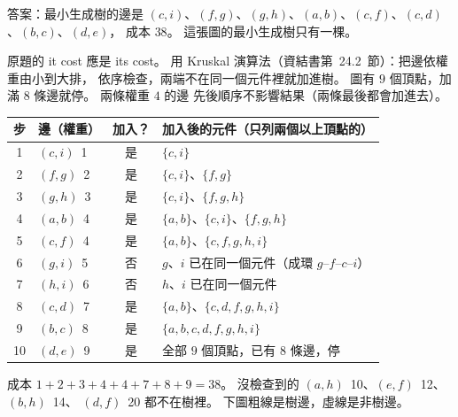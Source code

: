 \begin{pastsoln}
答案：最小生成樹的邊是 $(c,i)$、$(f,g)$、$(g,h)$、$(a,b)$、$(c,f)$、$(c,d)$、$(b,c)$、$(d,e)$，
成本 $38$。 這張圖的最小生成樹只有一棵。

原題的 it cost 應是 its cost。 用 Kruskal 演算法（資結書第~24.2~節）：把邊依權重由小到大排，
依序檢查，兩端不在同一個元件裡就加進樹。 圖有 $9$ 個頂點，加滿 $8$ 條邊就停。 兩條權重 $4$ 的邊
先後順序不影響結果（兩條最後都會加進去）。

\begin{center}
\small
\begin{tabular}{clcl}
\toprule
步 & 邊（權重） & 加入？ & 加入後的元件（只列兩個以上頂點的） \\
\midrule
1 & $(c,i)$~1 & 是 & $\{c,i\}$ \\
2 & $(f,g)$~2 & 是 & $\{c,i\}$、$\{f,g\}$ \\
3 & $(g,h)$~3 & 是 & $\{c,i\}$、$\{f,g,h\}$ \\
4 & $(a,b)$~4 & 是 & $\{a,b\}$、$\{c,i\}$、$\{f,g,h\}$ \\
5 & $(c,f)$~4 & 是 & $\{a,b\}$、$\{c,f,g,h,i\}$ \\
6 & $(g,i)$~5 & 否 & $g$、$i$ 已在同一個元件（成環 $g$--$f$--$c$--$i$） \\
7 & $(h,i)$~6 & 否 & $h$、$i$ 已在同一個元件 \\
8 & $(c,d)$~7 & 是 & $\{a,b\}$、$\{c,d,f,g,h,i\}$ \\
9 & $(b,c)$~8 & 是 & $\{a,b,c,d,f,g,h,i\}$ \\
10 & $(d,e)$~9 & 是 & 全部 $9$ 個頂點，已有 $8$ 條邊，停 \\
\bottomrule
\end{tabular}
\end{center}

成本 $1 + 2 + 3 + 4 + 4 + 7 + 8 + 9 = 38$。 沒檢查到的 $(a,h)$~10、$(e,f)$~12、$(b,h)$~14、
$(d,f)$~20 都不在樹裡。 下圖粗線是樹邊，虛線是非樹邊。


\end{pastsoln}
